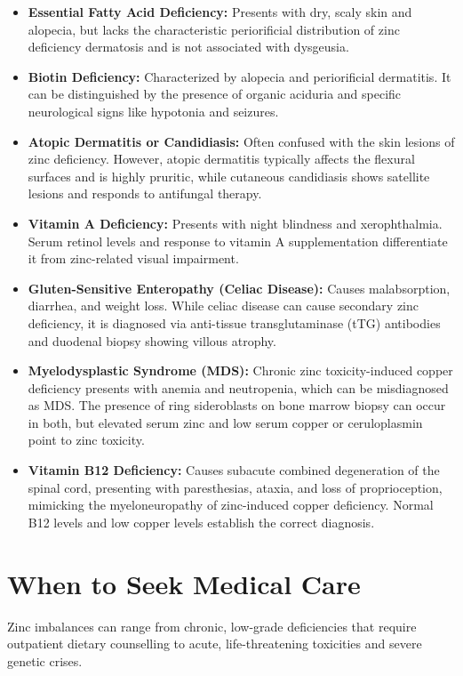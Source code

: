 \begin{itemize}
    \item \textbf{Essential Fatty Acid Deficiency:} Presents with dry, scaly skin and alopecia, but lacks the characteristic periorificial distribution of zinc deficiency dermatosis and is not associated with dysgeusia.
    \item \textbf{Biotin Deficiency:} Characterized by alopecia and periorificial dermatitis. It can be distinguished by the presence of organic aciduria and specific neurological signs like hypotonia and seizures.
    \item \textbf{Atopic Dermatitis or Candidiasis:} Often confused with the skin lesions of zinc deficiency. However, atopic dermatitis typically affects the flexural surfaces and is highly pruritic, while cutaneous candidiasis shows satellite lesions and responds to antifungal therapy.
    \item \textbf{Vitamin A Deficiency:} Presents with night blindness and xerophthalmia. Serum retinol levels and response to vitamin A supplementation differentiate it from zinc-related visual impairment.
    \item \textbf{Gluten-Sensitive Enteropathy (Celiac Disease):} Causes malabsorption, diarrhea, and weight loss. While celiac disease can cause secondary zinc deficiency, it is diagnosed via anti-tissue transglutaminase (tTG) antibodies and duodenal biopsy showing villous atrophy.
    \item \textbf{Myelodysplastic Syndrome (MDS):} Chronic zinc toxicity-induced copper deficiency presents with anemia and neutropenia, which can be misdiagnosed as MDS. The presence of ring sideroblasts on bone marrow biopsy can occur in both, but elevated serum zinc and low serum copper or ceruloplasmin point to zinc toxicity.
    \item \textbf{Vitamin B12 Deficiency:} Causes subacute combined degeneration of the spinal cord, presenting with paresthesias, ataxia, and loss of proprioception, mimicking the myeloneuropathy of zinc-induced copper deficiency. Normal B12 levels and low copper levels establish the correct diagnosis.
\end{itemize}

\section*{When to Seek Medical Care}
Zinc imbalances can range from chronic, low-grade deficiencies that require outpatient dietary counselling to acute, life-threatening toxicities and severe genetic crises.

